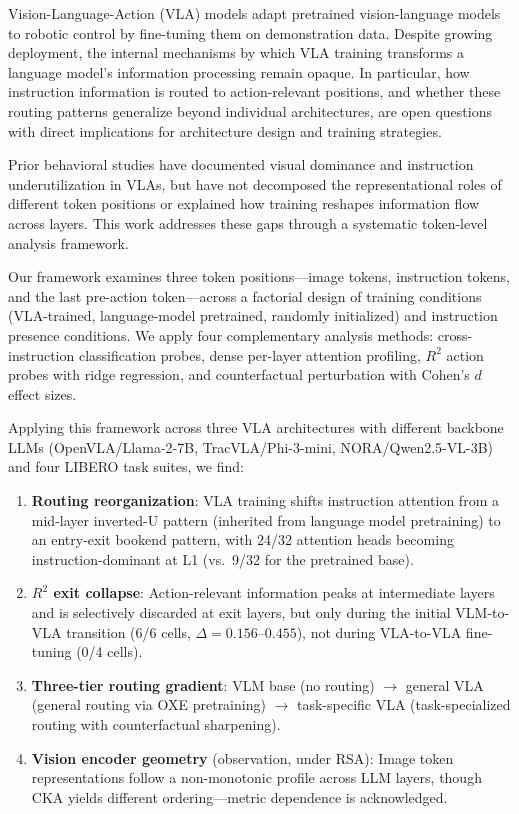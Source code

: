 \documentclass[10pt,letterpaper]{article}
\begin{document}
Vision-Language-Action (VLA) models adapt pretrained vision-language models to robotic control by fine-tuning them on demonstration data.
Despite growing deployment, the internal mechanisms by which VLA training transforms a language model's information processing remain opaque.
In particular, how instruction information is routed to action-relevant positions, and whether these routing patterns generalize beyond individual architectures, are open questions with direct implications for architecture design and training strategies.

Prior behavioral studies have documented visual dominance and instruction underutilization in VLAs, but have not decomposed the representational roles of different token positions or explained how training reshapes information flow across layers.
This work addresses these gaps through a systematic token-level analysis framework.

Our framework examines three token positions---image tokens, instruction tokens, and the last pre-action token---across a factorial design of training conditions (VLA-trained, language-model pretrained, randomly initialized) and instruction presence conditions.
We apply four complementary analysis methods: cross-instruction classification probes, dense per-layer attention profiling, $R^2$ action probes with ridge regression, and counterfactual perturbation with Cohen's $d$ effect sizes.

Applying this framework across three VLA architectures with different backbone LLMs (OpenVLA/Llama-2-7B, TracVLA/Phi-3-mini, NORA/Qwen2.5-VL-3B) and four LIBERO task suites, we find:

\begin{enumerate}
    \item \textbf{Routing reorganization}: VLA training shifts instruction attention from a mid-layer inverted-U pattern (inherited from language model pretraining) to an entry-exit bookend pattern, with 24/32 attention heads becoming instruction-dominant at L1 (vs.\ 9/32 for the pretrained base).
    \item \textbf{$R^2$ exit collapse}: Action-relevant information peaks at intermediate layers and is selectively discarded at exit layers, but only during the initial VLM-to-VLA transition (6/6 cells, $\Delta = 0.156$--$0.455$), not during VLA-to-VLA fine-tuning (0/4 cells).
    \item \textbf{Three-tier routing gradient}: VLM base (no routing) $\to$ general VLA (general routing via OXE pretraining) $\to$ task-specific VLA (task-specialized routing with counterfactual sharpening).
    \item \textbf{Vision encoder geometry} (observation, under RSA): Image token representations follow a non-monotonic profile across LLM layers, though CKA yields different ordering---metric dependence is acknowledged.
\end{enumerate}
\end{document}
